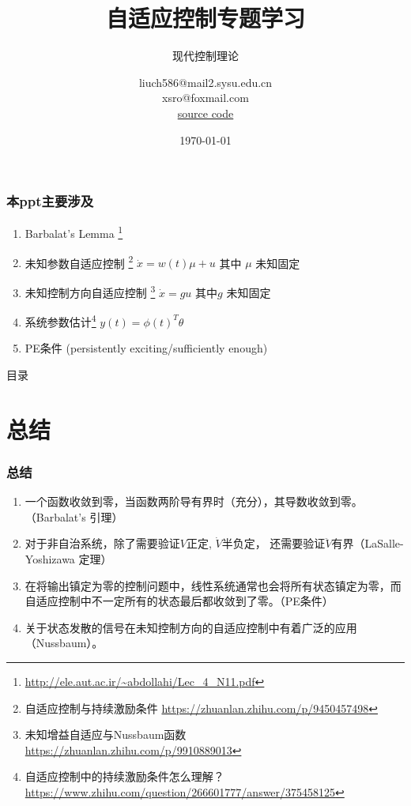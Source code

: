 \documentclass{beamer}
\title{自适应控制专题学习}
\subtitle{现代控制理论}
\author{liuch586@mail2.sysu.edu.cn\\
xsro@foxmail.com \\
\href{https://github.com/xsro/control-notes/tree/main/latex.control.adaptive.ctexbeamer}{source code}}
\institute{中山大学 航空航天学院}
\date{\today}
\begin{document}
\begin{frame}
  \titlepage
\end{frame}

\begin{frame}
  \frametitle{本ppt主要涉及}
  \begin{enumerate}
    \item Barbalat's Lemma \footnote{\url{http://ele.aut.ac.ir/~abdollahi/Lec_4_N11.pdf}}
    \item 未知参数自适应控制 \footnote{自适应控制与持续激励条件 \url{https://zhuanlan.zhihu.com/p/9450457498}}  $\dot{x}=w(t)\mu +u$ 其中 $\mu$ 未知固定
    \item 未知控制方向自适应控制 \footnote{未知增益自适应与Nussbaum函数 \url{https://zhuanlan.zhihu.com/p/9910889013}}  $\dot{x}=gu$ 其中$g$ 未知固定
    \item 系统参数估计\footnote{自适应控制中的持续激励条件怎么理解？ \url{https://www.zhihu.com/question/266601777/answer/375458125}} $y(t)=\phi(t)^T \theta$
    \item PE条件 (persistently exciting/sufficiently enough)
  \end{enumerate}
\end{frame}

\begin{frame}{目录}
  \tableofcontents[]
\end{frame}










\section{总结}

\begin{frame}
  \frametitle{总结}
  \begin{enumerate}
    \item 一个函数收敛到零，当函数两阶导有界时（充分），其导数收敛到零。（Barbalat's 引理）
    \item 对于非自治系统，除了需要验证$V$正定, $\dot{V}$半负定， 还需要验证$\ddot{V}$有界（LaSalle-Yoshizawa 定理）
    \item 在将输出镇定为零的控制问题中，线性系统通常也会将所有状态镇定为零，而自适应控制中不一定所有的状态最后都收敛到了零。（PE条件）
    \item 关于状态发散的信号在未知控制方向的自适应控制中有着广泛的应用（Nussbaum）。
  \end{enumerate}
  
\end{frame}
\end{document}
